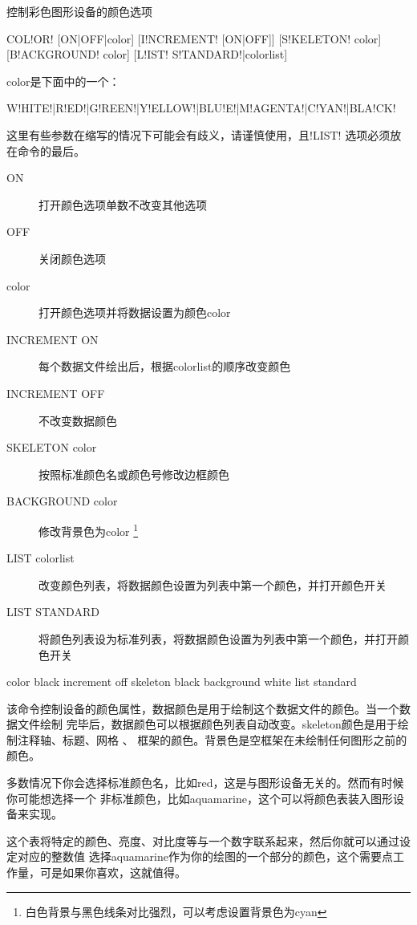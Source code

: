 \label{cmd:color}

控制彩色图形设备的颜色选项

\begin{SACSTX}
COL!OR! [ON|OFF|color] [I!NCREMENT! [ON|OFF]] [S!KELETON! color] [B!ACKGROUND! color]
    [L!IST! S!TANDARD!|colorlist]
\end{SACSTX}
color是下面中的一个：
\begin{SACSTX}
W!HITE!|R!ED!|G!REEN!|Y!ELLOW!|BLU!E!|M!AGENTA!|C!YAN!|BLA!CK!
\end{SACSTX}

这里有些参数在缩写的情况下可能会有歧义，请谨慎使用，且!LIST! 选项必须放在命令的最后。

\begin{description}
\item [ON] 打开颜色选项单数不改变其他选项
\item [OFF] 关闭颜色选项
\item [color] 打开颜色选项并将数据设置为颜色color
\item [INCREMENT ON] 每个数据文件绘出后，根据colorlist的顺序改变颜色
\item [INCREMENT OFF] 不改变数据颜色
\item [SKELETON color] 按照标准颜色名或颜色号修改边框颜色
\item [BACKGROUND color] 修改背景色为color
        \footnote{白色背景与黑色线条对比强烈，可以考虑设置背景色为cyan}
\item [LIST colorlist] 改变颜色列表，将数据颜色设置为列表中第一个颜色，并打开颜色开关
\item [LIST STANDARD] 将颜色列表设为标准列表，将数据颜色设置为列表中第一个颜色，并打开颜色开关
\end{description}

\begin{SACDFT}
color black increment off skeleton black background white list standard
\end{SACDFT}

该命令控制设备的颜色属性，数据颜色是用于绘制这个数据文件的颜色。当一个数据文件绘制
完毕后，数据颜色可以根据颜色列表自动改变。skeleton颜色是用于绘制注释轴、标题、网格 、
框架的颜色。背景色是空框架在未绘制任何图形之前的颜色。

多数情况下你会选择标准颜色名，比如red，这是与图形设备无关的。然而有时候你可能想选择一个
非标准颜色，比如aquamarine，这个可以将颜色表装入图形设备来实现。

这个表将特定的颜色、亮度、对比度等与一个数字联系起来，然后你就可以通过设定对应的整数值
选择aquamarine作为你的绘图的一个部分的颜色，这个需要点工作量，可是如果你喜欢，这就值得。

